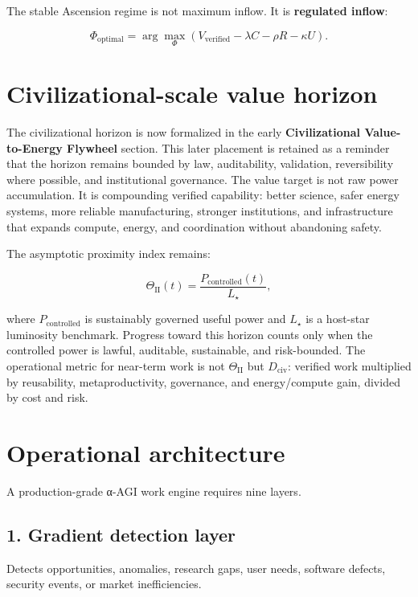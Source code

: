 \documentclass[
  11pt,
]{article}
\begin{document}
The stable Ascension regime is not maximum inflow. It is
\textbf{regulated inflow}:

\[
\Phi_{\text{optimal}}
=
\arg\max_{\Phi}
\left(V_{\text{verified}}-\lambda C-\rho R-\kappa U\right).
\]

\section{Civilizational-scale value
horizon}\label{civilizational-scale-value-horizon}

The civilizational horizon is now formalized in the early
\textbf{Civilizational Value-to-Energy Flywheel} section. This later
placement is retained as a reminder that the horizon remains bounded by
law, auditability, validation, reversibility where possible, and
institutional governance. The value target is not raw power
accumulation. It is compounding verified capability: better science,
safer energy systems, more reliable manufacturing, stronger
institutions, and infrastructure that expands compute, energy, and
coordination without abandoning safety.

The asymptotic proximity index remains:

\[
\Theta_{\mathrm{II}}(t)=\frac{P_{\mathrm{controlled}}(t)}{L_{\star}},
\]

where \(P_{\mathrm{controlled}}\) is sustainably governed useful power
and \(L_{\star}\) is a host-star luminosity benchmark. Progress toward
this horizon counts only when the controlled power is lawful, auditable,
sustainable, and risk-bounded. The operational metric for near-term work
is not \(\Theta_{\mathrm{II}}\) but \(D_{\mathrm{civ}}\): verified work
multiplied by reusability, metaproductivity, governance, and
energy/compute gain, divided by cost and risk.

\section{Operational architecture}\label{operational-architecture}

A production-grade α-AGI work engine requires nine layers.

\subsection{1. Gradient detection layer}\label{gradient-detection-layer}

Detects opportunities, anomalies, research gaps, user needs, software
defects, security events, or market inefficiencies.
\end{document}
